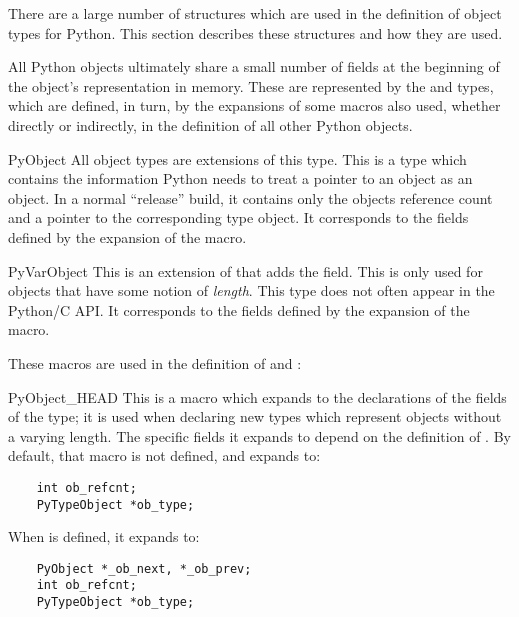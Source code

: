 There are a large number of structures which are used in the
definition of object types for Python.  This section describes these
structures and how they are used.

All Python objects ultimately share a small number of fields at the
beginning of the object's representation in memory.  These are
represented by the  and  types,
which are defined, in turn, by the expansions of some macros also
used, whether directly or indirectly, in the definition of all other
Python objects.

\begin{ctypedesc}{PyObject}
  All object types are extensions of this type.  This is a type which
  contains the information Python needs to treat a pointer to an
  object as an object.  In a normal ``release'' build, it contains
  only the objects reference count and a pointer to the corresponding
  type object.  It corresponds to the fields defined by the
  expansion of the  macro.
\end{ctypedesc}

\begin{ctypedesc}{PyVarObject}
  This is an extension of  that adds the
   field.  This is only used for objects that have
  some notion of \emph{length}.  This type does not often appear in
  the Python/C API.  It corresponds to the fields defined by the
  expansion of the  macro.
\end{ctypedesc}

These macros are used in the definition of  and
:

\begin{csimplemacrodesc}{PyObject_HEAD}
  This is a macro which expands to the declarations of the fields of
  the  type; it is used when declaring new types which
  represent objects without a varying length.  The specific fields it
  expands to depend on the definition of
  .  By default, that macro is not
  defined, and  expands to:
  \begin{verbatim}
    int ob_refcnt;
    PyTypeObject *ob_type;
  \end{verbatim}
  When  is defined, it expands to:
  \begin{verbatim}
    PyObject *_ob_next, *_ob_prev;
    int ob_refcnt;
    PyTypeObject *ob_type;
  \end{verbatim}
\end{csimplemacrodesc}


